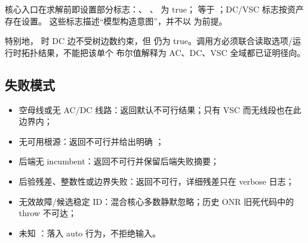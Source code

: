 核心入口在求解前即设置部分标志：、
、 为 true；
 等于 ；DC/VSC 标志按资产存在设置。
这些标志描述“模型构造意图”，并不以  为前提。

特别地， 时 DC 边不受树边数约束，但
 仍为 true。调用方必须联合读取选项/运行时拓扑结果，不能把该单个
布尔值解释为 AC、DC、VSC 全域都已证明径向。

\subsection{失败模式}

\begin{itemize}
  \item 空母线或无 AC/DC 线路：返回默认不可行结果；只有 VSC 而无线段也在此边界内；
  \item 无可用根源：返回不可行并给出明确 ；
  \item 后端无 incumbent：返回不可行并保留后端失败摘要；
  \item 后验残差、整数性或边界失败：返回不可行，详细残差只在 verbose 日志；
  \item 无效故障/候选稳定 ID：混合核心多数静默忽略；历史 ONR 旧死代码中的 throw 不可达；
  \item 未知 ：落入 auto 行为，不拒绝输入。
\end{itemize}
